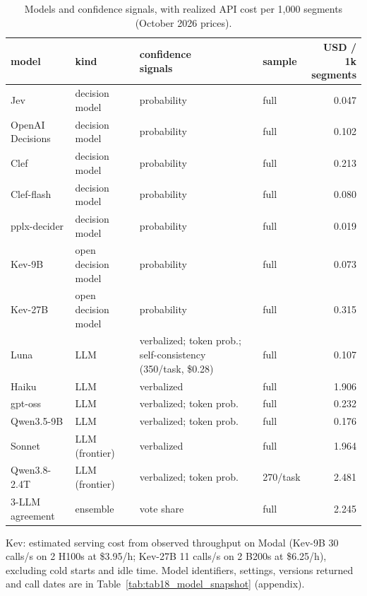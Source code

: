 \begin{table}[t]
\centering
\small
\caption{Models and confidence signals, with realized API cost per 1,000 segments (October 2026 prices).}
\label{tab:main_coders}
\begin{adjustbox}{max width=\linewidth}
\begin{tabular}{llllr}
\toprule
model & kind & \makecell[bl]{confidence \\{} signals} & sample & \makecell[br]{USD / 1k \\{} segments} \\
\midrule
Jev & decision model & probability & full & 0.047 \\
OpenAI Decisions & decision model & probability & full & 0.102 \\
Clef & decision model & probability & full & 0.213 \\
Clef-flash & decision model & probability & full & 0.080 \\
pplx-decider & decision model & probability & full & 0.019 \\
Kev-9B & open decision model & probability & full & 0.073 \\
Kev-27B & open decision model & probability & full & 0.315 \\
Luna & LLM & verbalized; token prob.; self-consistency (350/task, \$0.28) & full & 0.107 \\
Haiku & LLM & verbalized & full & 1.906 \\
gpt-oss & LLM & verbalized; token prob. & full & 0.232 \\
Qwen3.5-9B & LLM & verbalized; token prob. & full & 0.176 \\
Sonnet & LLM (frontier) & verbalized & full & 1.964 \\
Qwen3.8-2.4T & LLM (frontier) & verbalized; token prob. & 270/task & 2.481 \\
3-LLM agreement & ensemble & vote share & full & 2.245 \\
\bottomrule
\end{tabular}
\end{adjustbox}
\par\smallskip\footnotesize\raggedright Kev: estimated serving cost from observed throughput on Modal (Kev-9B 30 calls/s on 2 H100s at \$3.95/h; Kev-27B 11 calls/s on 2 B200s at \$6.25/h), excluding cold starts and idle time. Model identifiers, settings, versions returned and call dates are in Table~\ref{tab:tab18_model_snapshot} (appendix).
\end{table}
